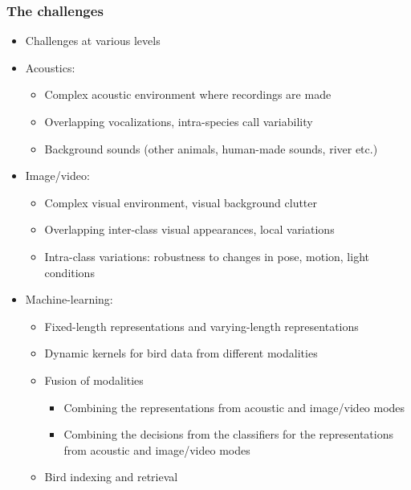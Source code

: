 \documentclass[mathserif]{beamer}
\begin{document}
\begin{frame}
\frametitle{The challenges}
\begin{itemize}
\item<2-> Challenges at various levels
\item<3-> Acoustics:
	\begin{itemize}
	\item<4-> Complex acoustic environment where recordings are made
	\item<5-> Overlapping vocalizations, intra-species call variability
	\item<6-> Background sounds (other animals, human-made sounds, river etc.)
	\end{itemize}
\item<7-> Image/video: 
	\begin{itemize}
	\item<8-> Complex visual environment, visual background clutter
	\item<9-> Overlapping inter-class visual appearances, local variations  
	\item<10-> Intra-class variations: robustness to changes in pose, motion, light conditions
	\end{itemize}
\item<11-> Machine-learning:
	\begin{itemize}
	\item<12-> Fixed-length representations and varying-length representations
	\item<13-> Dynamic kernels for bird data from different modalities
	\item<14-> Fusion of modalities
	\begin{itemize}
	    \item<15-> Combining the representations from acoustic and image/video modes
	    \item<16-> Combining the decisions from the classifiers for the representations from acoustic and image/video modes
	\end{itemize}
	\item<17-> Bird indexing and retrieval
	\end{itemize}
\end{itemize}
\end{frame}
\end{document}
